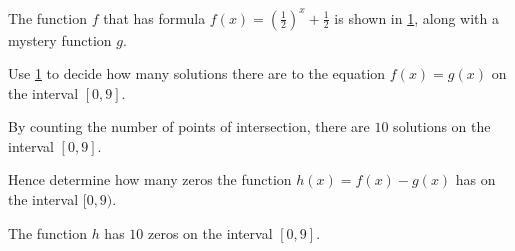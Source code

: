 \begin{exercises}
\begin{problem}
The function $f$ that has formula $f(x)=\left( \frac{1}{2} \right)^x+\frac{1}{2}$ is shown in \cref{exp:fig:extension}, 
along with a mystery function $g$.
\end{problem}
\begin{figure}[!htb]
	\begin{widepage}
	\caption{}
	\label{exp:fig:extension}
	\end{widepage}
\end{figure}
\begin{subproblem}
	Use \cref{exp:fig:extension} to decide how many solutions there are to the equation $f(x)=g(x)$
	on the interval $[0,9]$.
	\begin{shortsolution}
		By counting the number of points of intersection, there are $10$ solutions on 
		the interval $[0,9]$.
	\end{shortsolution}
\end{subproblem}
\begin{subproblem}
	Hence determine how many zeros the function $h(x)=f(x)-g(x)$
	has on the interval $[0,9)$.
	\begin{shortsolution}
		The function $h$ has $10$ zeros on the interval $[0,9]$.
	\end{shortsolution}
\end{subproblem}
\end{exercises}
			
